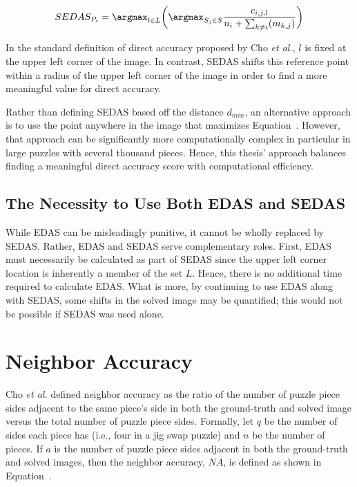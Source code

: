 \begin{equation} \label{eq:shiftableEnhancedDirectAccuracyScore}
SEDAS_{P_i} = \argmax_{l \in L} \bigg( \argmax_{S_j \in S}\frac{c_{i,j,l}}{n_i + \sum_{k \ne i}(m_{k,j})} \bigg)
\end{equation}

\noindent
In the standard definition of direct accuracy proposed by Cho \textit{et al.}, $l$ is fixed at the upper left corner of the image.  In contrast, SEDAS shifts this reference point within a radius of the upper left corner of the image in order to find a more meaningful value for direct accuracy. 

Rather than defining SEDAS based off the distance $d_{min}$, an alternative approach is to use the point anywhere in the image that maximizes Equation~.  However, that approach can be significantly more computationally complex in particular in large puzzles with several thousand pieces.  Hence, this thesis' approach balances finding a meaningful direct accuracy score with computational efficiency.

\subsection{The Necessity to Use Both EDAS and SEDAS}\label{sec:importanceEdasSedas}

While EDAS can be misleadingly punitive, it cannot be wholly replaced by SEDAS.  Rather, EDAS and SEDAS serve complementary roles.  First, EDAS must necessarily be calculated as part of SEDAS since the upper left corner location is inherently a member of the set $L$.  Hence, there is no additional time required to calculate EDAS.  What is more, by continuing to use EDAS along with SEDAS, some shifts in the solved image may be quantified; this would not be possible if SEDAS was used alone.

\section{Neighbor Accuracy}\label{sec:neighborAccuracy}

Cho \textit{et al.} \cite{cho2010} defined neighbor accuracy as the ratio of the number of puzzle piece sides adjacent to the same piece's side in both the ground-truth and solved image versus the total number of puzzle piece sides.  Formally, let $q$ be the number of sides each piece has (i.e., four in a jig swap puzzle) and $n$ be the number of pieces.  If $a$ is the number of puzzle piece sides adjacent in both the ground-truth and solved images, then the neighbor accuracy, $NA$, is defined as shown in Equation~.

